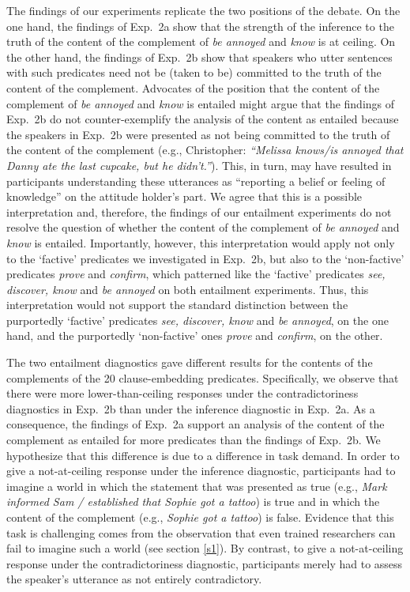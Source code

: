 \documentclass[11pt,fleqn]{article}
\newcommand{\6}{\mbox{$[\hspace*{-.6mm}[$}}
\newcommand{\9}{\mbox{$]\hspace*{-.6mm}]$}}
\begin{document}
{\begin{exe}
\end{exe}
The findings of our experiments replicate the two positions of the debate. On the one hand, the findings of Exp.~2a show that the strength of the inference to the truth of the content of the complement of {\em be annoyed} and {\em know} is at ceiling. On the other hand, the findings of Exp.~2b show that speakers who utter sentences with such predicates need not be (taken to be) committed to the truth of the content of the complement. Advocates of the position that the content of the complement of {\em be annoyed} and {\em know} is entailed might argue that the findings of Exp.~2b do not counter-exemplify the analysis of the content as entailed because the speakers in Exp.~2b were presented as not being committed to the truth of the content of the complement (e.g., Christopher: {\em ``Melissa knows/is annoyed that Danny ate the last cupcake, but he didn't.''}). This, in turn, may have resulted in participants understanding these utterances as ``reporting a belief or feeling of knowledge'' on the attitude holder's part. We agree that this is a possible interpretation and, therefore, the findings of our entailment experiments do not resolve the question of whether the content of the complement of {\em be annoyed} and {\em know} is entailed. Importantly, however, this interpretation would apply not only to the `factive' predicates we investigated in Exp.~2b, but also to the `non-factive' predicates {\em prove} and {\em confirm}, which patterned like the `factive' predicates {\em see, discover, know} and {\em be annoyed} on both entailment experiments. Thus, this interpretation would not support the standard distinction between the purportedly `factive' predicates {\em see, discover, know} and {\em be annoyed}, on the one hand, and the purportedly `non-factive' ones  {\em prove} and {\em confirm}, on the other.

The two entailment diagnostics gave different results for the contents of the complements of the 20 clause-embedding predicates. Specifically, we  observe that there were more lower-than-ceiling responses under the contradictoriness diagnostics in Exp.~2b than under the inference diagnostic in Exp.~2a. As a consequence, the findings of Exp.~2a support an analysis of the content of the complement as  entailed for more predicates than the findings of Exp.~2b. We hypothesize that this difference is due to a difference in task demand. In order to give a not-at-ceiling response under the inference diagnostic, participants had to imagine a world in which the statement that was presented as true (e.g., {\em Mark informed Sam / established that Sophie got a tattoo}) is true and in which the content of the complement (e.g., {\em Sophie got a tattoo}) is false. Evidence that this task is challenging comes from the observation that even trained researchers can fail to imagine such a world (see section \ref{s1}). By contrast, to give a not-at-ceiling response under the contradictoriness diagnostic, participants merely had to assess the speaker's utterance as not entirely contradictory. 

}
\end{document}
